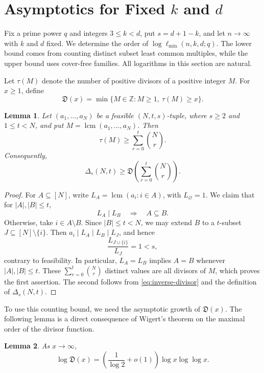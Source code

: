\documentclass[11pt,onecolumn]{IEEEtran}
\newtheorem{lemma}{Lemma}
\newcommand{\lcmop}{\operatorname{lcm}}
\newcommand{\ellmin}{\ell_{\min}}
\begin{document}
\section{Asymptotics for Fixed \texorpdfstring{$k$ and $d$}{k and d}}
\label{sec:fixed-parameters}

Fix a prime power $q$ and integers $3\le k<d$, put $s=d+1-k$,
and let $n\to\infty$ with $k$ and $d$ fixed.  We determine the order
of $\log\ellmin(n,k,d;q)$.  The lower bound comes from counting
distinct subset least common multiples, while the upper bound uses
cover-free families.  All logarithms in this section are natural.

Let $\tau(M)$ denote the number of positive divisors of
a positive integer $M$. For $x\ge1$, define
\begin{equation}
\mathfrak D(x)=\min\{M\in\mathbb Z: M\ge1,\ \tau(M)\ge x\}.
\label{eq:inverse-divisor}
\end{equation}

\begin{lemma}
\label{lem:subset-lcm-count}
Let $(a_1,\ldots,a_N)$ be a feasible $(N,t,s)$-tuple, where
$s\ge2$ and $1\le t<N$, and put $M=\lcmop(a_1,\ldots,a_N)$.
Then
\[
\tau(M)\ge\sum_{r=0}^{t}\binom Nr.
\]
Consequently,
\[
\Delta_s(N,t)\ge
\mathfrak D\!\left(\sum_{r=0}^{t}\binom Nr\right).
\]
\end{lemma}

\begin{proof}
For $A\subseteq[N]$, write $L_A=\lcmop(a_i:i\in A)$, with
$L_\varnothing=1$.  We claim that for $|A|,|B|\le t$,
\[
L_A\mid L_B\quad\Longrightarrow\quad A\subseteq B.
\]
Otherwise, take $i\in A\setminus B$.  Since $|B|\le t<N$,
we may extend $B$ to a $t$-subset
$J\subseteq[N]\setminus\{i\}$.  Then
$a_i\mid L_A\mid L_B\mid L_J$, and hence
\[
\frac{L_{J\cup\{i\}}}{L_J}=1<s,
\]
contrary to feasibility.  In particular, $L_A=L_B$ implies
$A=B$ whenever $|A|,|B|\le t$.  These
$\sum_{r=0}^{t}\binom Nr$ distinct values are all divisors of $M$,
which proves the first assertion.  The second follows from
\eqref{eq:inverse-divisor} and the definition of $\Delta_s(N,t)$.
\end{proof}

To use this counting bound, we need the asymptotic growth of
$\mathfrak D(x)$.  The following lemma is a direct consequence of
Wigert's theorem on the maximal order of the divisor function.

\begin{lemma}
\label{lem:inverse-divisor-estimate}
As $x\to\infty$,
\begin{equation}
\log\mathfrak D(x)
=\left(\frac{1}{\log2}+o(1)\right)\log x\log\log x.
\label{eq:inverse-divisor-asymptotic}
\end{equation}
\end{lemma}
\end{document}

